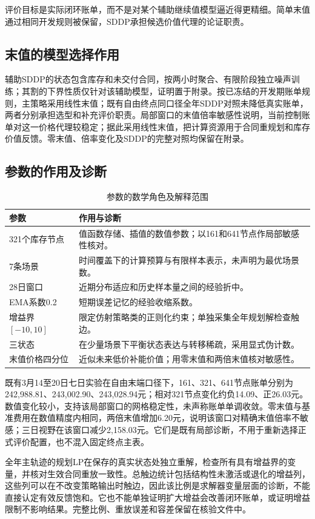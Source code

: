 \documentclass[UTF8,a4paper,zihao=-4,fontset=mac]{ctexart}
\begin{document}
评价目标是实际闭环账单，而不是对某个辅助继续值模型逼近得更精细。简单末值通过相同开发规则被保留，SDDP承担候选价值代理的论证职责。

\subsection{末值的模型选择作用}
辅助SDDP的状态包含库存和未交付合同，按两小时聚合、有限阶段独立噪声训练；其割的下界性质仅针对该辅助模型，证明置于附录。按已冻结的开发期账单规则，主策略采用线性末值；既有自由终点同口径全年SDDP对照未降低真实账单，两者分别承担选型和补充评价职责。局部窗口的末值倍率敏感性说明，当前控制账单对这一价格代理较稳定；据此采用线性末值，把计算资源用于合同重规划和库存价值反馈。零末值、倍率变化及SDDP的完整对照均保留在附录。 

\subsection{参数的作用及诊断}
\begin{table}[htbp]\centering\small
\caption{参数的数学角色及解释范围}
\begin{tabular}{lp{10.2cm}}\toprule
参数 & 作用与诊断 \\ \midrule
321个库存节点 & 值函数存储、插值的数值参数；以161和641节点作局部敏感性核对。 \\
7条场景 & 时间覆盖下的计算预算与有限样本表示，未声明为最优场景数。 \\
28日窗口 & 近期分布适应和历史样本量之间的经验折中。 \\
EMA系数0.2 & 短期误差记忆的经验收缩系数。 \\
增益界$[-10,10]$ & 限定仿射策略类的正则化约束；单独采集全年规划解检查触边。 \\
三状态 & 在少量场景下平衡状态表达与转移稀疏，采用显式伪计数。 \\
末值价格四分位 & 近似未来低价补能价值；用零末值和两倍末值核对敏感性。 \\
\bottomrule\end{tabular}\end{table}
既有3月14至20日七日实验在自由末端口径下，161、321、641节点账单分别为242,988.81、243,002.90、243,028.94元；相对321节点变化约负14.09、正26.03元。数值变化较小，支持该局部窗口的网格稳定性，未声称账单单调收敛。零末值与基准费用在数值精度内相同，两倍末值增加6.20元，说明该窗口对精确末值倍率不敏感；三日视野在该窗口减少2,158.03元。它们是既有局部诊断，不用于重新选择正式评价配置，也不混入固定终点主表。


全年主轨迹的规划LP在保存的真实状态处独立重解，检查所有具有增益界的变量，并核对生效合同重放一致性。总触边统计包括结构性未激活或退化的增益列，这些列可以在不改变策略输出时触边，因此该比例是求解器变量层面的诊断，不能直接认定有效反馈饱和。它也不能单独证明扩大增益会改善闭环账单，或证明增益限制不影响结果。完整比例、重放误差和容差保留在核验文件中。
\end{document}
